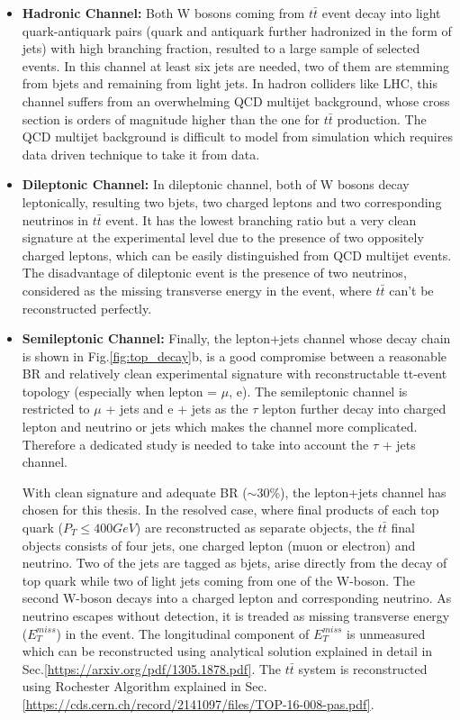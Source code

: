 \begin{itemize}
\item {\textbf{Hadronic Channel:}}
Both W bosons coming from $t\bar{t}$ event decay into light quark-antiquark pairs (quark and antiquark further hadronized in the form of jets) with high branching fraction, resulted to a large sample of selected events. In this channel at least six jets are needed, two of them are stemming from bjets and remaining from light jets. In hadron colliders like LHC, this channel  suffers from an overwhelming QCD multijet background, whose cross section is orders of magnitude higher than the one for $t\bar{t}$ production. The QCD multijet background is difficult to model from simulation which requires data driven technique to take it from data.
\item{\textbf{Dileptonic Channel:}}
In dileptonic channel, both of W bosons decay leptonically, resulting two bjets, two charged leptons and two corresponding neutrinos in $t\bar{t}$ event. It has the lowest branching ratio but a very clean signature at the experimental level due to the presence of two oppositely charged leptons, which can be easily distinguished from QCD multijet events. The disadvantage of dileptonic event is the presence of two neutrinos, considered as the missing transverse energy in the event, where $t\bar{t}$ can’t be reconstructed perfectly. 
\item{\textbf{Semileptonic Channel:}}
Finally, the lepton+jets channel whose decay chain is shown in Fig.\ref{fig:top_decay}b, is a good compromise between a reasonable
BR and relatively clean experimental signature with reconstructable tt-event topology (especially when lepton = $\mu$, e). The semileptonic channel is restricted to $\mu$ + jets and e + jets as the $\tau$ lepton further decay into charged lepton and neutrino or jets which makes the channel more complicated. Therefore a dedicated study is needed to take into account the $\tau$ + jets channel.
 
With clean signature and adequate BR ($\sim$30\%), the lepton+jets channel has chosen for this thesis. In the resolved case, where final products of each top quark ($P_{T} \le 400GeV$) are reconstructed as separate objects, the $t\bar{t}$ final objects consists of four jets, one charged lepton (muon or electron) and neutrino. Two of the jets are tagged as bjets, arise directly from the decay of top quark while two of light jets coming from one of the W-boson. The second W-boson decays into a charged lepton and corresponding neutrino. As neutrino escapes without detection, it is treaded as missing transverse energy ($E^{miss}_{T}$) in the event. The longitudinal component of $E^{miss}_{T}$ is unmeasured which can be reconstructed using analytical solution explained in detail in Sec.\ref{https://arxiv.org/pdf/1305.1878.pdf}. The $t\bar{t}$ system is reconstructed using Rochester Algorithm explained in Sec.\ref{https://cds.cern.ch/record/2141097/files/TOP-16-008-pas.pdf}.      
\end{itemize}
